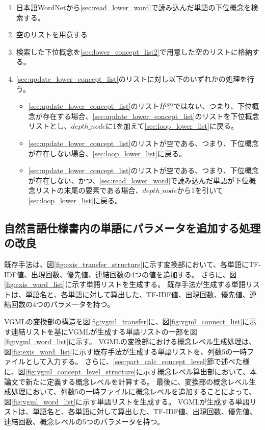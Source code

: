 \begin{enumerate}
\begin{enumerate}
\begin{enumerate}
                    \item 日本語WordNetから\ref{sec:read_lower_word}で読み込んだ単語の下位概念を検索する。
                    \item 空のリストを用意する
                    \label{sec:lower_concept_list2}
                    \item 検索した下位概念を\ref{sec:lower_concept_list2}で用意した空のリストに格納する。
                    \label{sec:update_lower_concept_list}
                    \item \ref{sec:update_lower_concept_list}のリストに対し以下のいずれかの処理を行う。
                    \begin{itemize}
                        \item \ref{sec:update_lower_concept_list}のリストが空ではない、つまり、下位概念が存在する場合、\ref{sec:update_lower_concept_list}のリストを下位概念リストとし、$depth\_node$に1を加えて\ref{sec:loop_lower_list}に戻る。
                        \item \ref{sec:update_lower_concept_list}のリストが空である、つまり、下位概念が存在しない場合、\ref{sec:loop_lower_list}に戻る。
                        \item \ref{sec:update_lower_concept_list}のリストが空である、つまり、下位概念が存在しない、かつ、\ref{sec:read_lower_word}で読み込んだ単語が下位概念リストの末尾の要素である場合、$depth\_node$から1を引いて\ref{sec:loop_lower_list}に戻る。
                    \end{itemize}
                \end{enumerate}
        \end{enumerate}
\end{enumerate}

\subsection{自然言語仕様書内の単語にパラメータを追加する処理の改良}
\label{sec:improve_word_list}
既存手法は、図\ref{fig:exis_transfer_structure}に示す変換部において、各単語にTF-IDF値、出現回数、優先値、連結回数の4つの値を追加する。
さらに、図\ref{fig:exis_word_list}に示す単語リストを生成する。
既存手法が生成する単語リストは、単語名と、各単語に対して算出した、TF-IDF値、出現回数、優先値、連結回数の4つのパラメータを持つ。

VGMLの変換部の構造を図\ref{fig:vgml_transfer}に、図\ref{fig:vgml_connect_list}に示す連結リストを基にVGMLが生成する単語リストの一部を図\ref{fig:vgml_word_list}に示す。
VGMLの変換部における概念レベル生成処理は、図\ref{fig:exis_word_list}に示す既存手法が生成する単語リストを、列数5の一時ファイルとして入力する。
さらに、\ref{sec:part_calc_concept_level}節で述べた様に、図\ref{fig:vgml_concept_level_structure}に示す概念レベル算出部において、本論文で新たに定義する概念レベルを計算する。
最後に、変換部の概念レベル生成処理において、列数5の一時ファイルに概念レベルを追加することによって、図\ref{fig:vgml_word_list}に示す単語リストを生成する。
VGMLが生成する単語リストは、単語名と、各単語に対して算出した、TF-IDF値、出現回数、優先値、連結回数、概念レベルの5つのパラメータを持つ。

